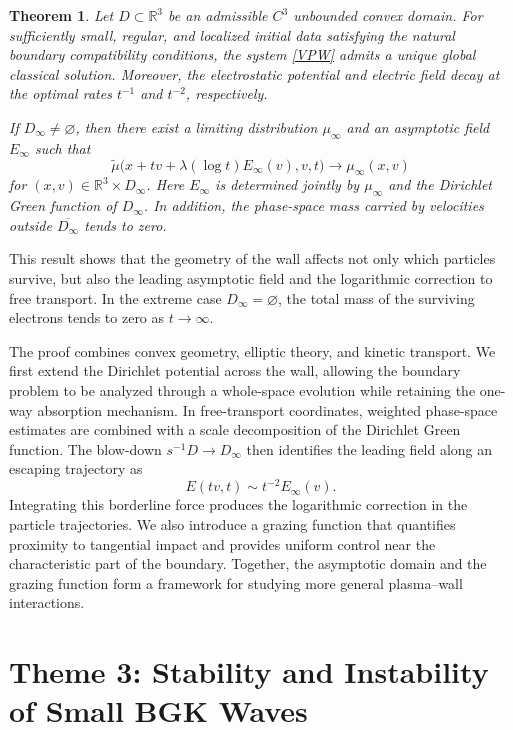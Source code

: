\documentclass[10pt,reqno]{amsart}
\newtheorem{theorem}{Theorem}
\theoremstyle{definition}
\begin{document}
\begin{theorem}\label{thm:VP-Wall}
Let $D\subset\mathbb{R}^3$ be an admissible $C^3$ unbounded convex domain. For sufficiently small, regular, and localized initial data satisfying the natural boundary compatibility conditions, the system \eqref{VPW} admits a unique global classical solution. Moreover, the electrostatic potential and electric field decay at the optimal rates $t^{-1}$ and $t^{-2}$, respectively.

If $D_\infty\neq\varnothing$, then there exist a limiting distribution $\mu_\infty$ and an asymptotic field $E_\infty$ such that
\[
\widetilde{\mu}
\bigl(x+tv+\lambda(\log t)E_\infty(v),v,t\bigr)
\longrightarrow \mu_\infty(x,v)
\]
 for $(x,v)\in\mathbb{R}^3\times D_\infty$. Here $E_\infty$ is determined jointly by $\mu_\infty$ and the Dirichlet Green function of $D_\infty$. In addition, the phase-space mass carried by velocities outside $\overline{D_\infty}$ tends to zero.
\end{theorem}

This result shows that the geometry of the wall affects not only which particles survive, but also the leading asymptotic field and the logarithmic correction to free transport. In the extreme case $D_\infty=\varnothing$, the total mass of the surviving electrons tends to zero as $t\to\infty$.

The proof combines convex geometry, elliptic theory, and kinetic transport. We first extend the Dirichlet potential across the wall, allowing the boundary problem to be analyzed through a whole-space evolution while retaining the one-way absorption mechanism. In free-transport coordinates, weighted phase-space estimates are combined with a scale decomposition of the Dirichlet Green function. The blow-down
\(
s^{-1}D\rightarrow D_\infty
\)
then identifies the leading field along an escaping trajectory as
\[
E(tv,t)\sim t^{-2}E_\infty(v).
\]
Integrating this borderline force produces the logarithmic correction in the particle trajectories. We also introduce a grazing function that quantifies proximity to tangential impact and provides uniform control near the characteristic part of the boundary. Together, the asymptotic domain and the grazing function form a framework for studying more general plasma--wall interactions.


\section*{Theme 3: Stability and Instability of Small BGK Waves}
\providecommand{\HM}{\mathrm{HM}}
\end{document}
